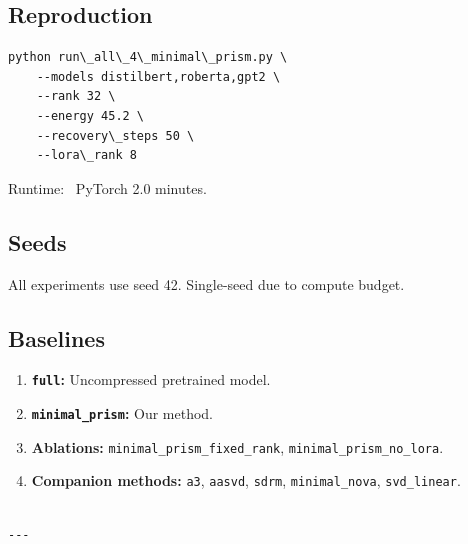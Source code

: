 \subsection{Reproduction}

\begin{lstlisting}
python run\_all\_4\_minimal\_prism.py \
    --models distilbert,roberta,gpt2 \
    --rank 32 \
    --energy 45.2 \
    --recovery\_steps 50 \
    --lora\_rank 8
\end{lstlisting}

Runtime: ~PyTorch 2.0 minutes.

\subsection{Seeds}

All experiments use seed 42. Single-seed due to compute budget.

\subsection{Baselines}

\begin{enumerate}
\item \textbf{\texttt{full}:} Uncompressed pretrained model.
\item \textbf{\texttt{minimal\_prism}:} Our method.
\item \textbf{Ablations:} \texttt{minimal\_prism\_fixed\_rank}, \texttt{minimal\_prism\_no\_lora}.
\item \textbf{Companion methods:} \texttt{a3}, \texttt{aasvd}, \texttt{sdrm}, \texttt{minimal\_nova}, \texttt{svd\_linear}.
\end{enumerate}
\begin{lstlisting}

---
\end{lstlisting}